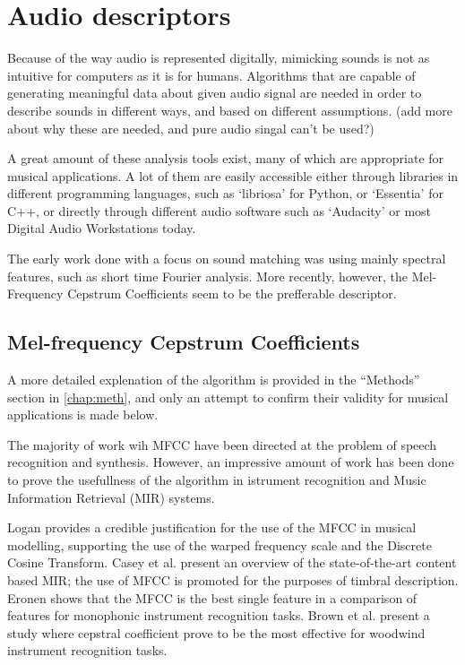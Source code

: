 \section{Audio descriptors}

Because of the way audio is represented digitally, mimicking sounds is
not as intuitive for computers as it is for humans. Algorithms that
are capable of generating meaningful data about given audio signal are
needed in order to describe sounds in different ways, and based on
different assumptions. (add more about why these are needed, and pure
audio singal can't be used?)

A great amount of these analysis tools exist, many of which are
appropriate for musical applications\cite{peeters_timbre_2011}. A lot
of them are easily accessible either through libraries in different
programming languages, such as
`libriosa'\cite{noauthor_librosa_nodate} for Python, or
`Essentia'\cite{noauthor_homepage_nodate} for C++, or directly through
different audio software such as
`Audacity'\cite{noauthor_audacity_nodate} or most Digital Audio
Workstations today.

The early work done with a focus on sound matching was using mainly
spectral features\cite{mitchell_frequency_2005}, such as short time
Fourier analysis\cite{horner_machine_1993}. More recently, however,
the Mel-Frequency Cepstrum Coefficients seem to be the prefferable
descriptor\cite{davis_comparison_1980}\cite{yee-king_comparison_2011}.

\subsection{Mel-frequency Cepstrum Coefficients}

A more detailed explenation of the algorithm is provided in the
``Methods'' section in \autoref{chap:meth}, and only an attempt to
confirm their validity for musical applications is made below.

The majority of work wih MFCC have been directed at the problem of
speech recognition and synthesis. However, an impressive amount of
work has been done to prove the usefullness of the algorithm in
istrument recognition and Music Information Retrieval (MIR) systems.

Logan provides a credible justification for the use of the MFCC
in musical modelling, supporting the use of the warped frequency scale
and the Discrete Cosine
Transform\cite{noauthor_logan00mel.pdf_nodate}. Casey et al. present
an overview of the state-of-the-art content based MIR; the use of MFCC
is promoted for the purposes of timbral
description\cite{casey_content-based_2008}. Eronen shows that the MFCC
is the best single feature in a comparison of features for monophonic
instrument recognition tasks\cite{eronen_comparison_2001}. Brown et
al. present a study where cepstral coefficient prove to be the most
effective for woodwind instrument recognition
tasks\cite{brown_feature_2001}.

